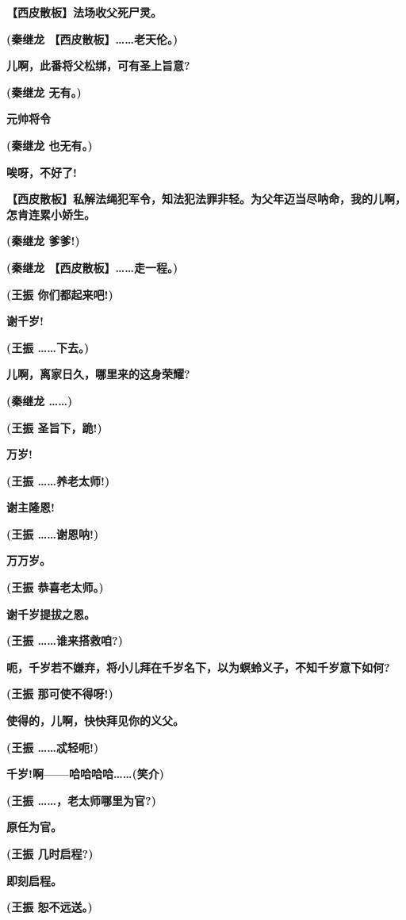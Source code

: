 \textbf{【西皮散板】法场收父死尸灵。}

\textbf{(秦继龙 【西皮散板】\ldots{}\ldots{}老天伦。)}

\textbf{儿啊，此番将父松绑，可有圣上旨意?}

\textbf{(秦继龙 无有。)}

\textbf{元帅将令}

\textbf{(秦继龙 也无有。)}

\textbf{唉呀，不好了!}

\textbf{【西皮散板】私解法绳犯军令，知法犯法罪非轻。为父年迈当尽呐命，我的儿啊，怎肯连累小娇生。}

\textbf{(秦继龙 爹爹!)}

\textbf{(秦继龙 【西皮散板】\ldots{}\ldots{}走一程。)}

\textbf{(王振 你们都起来吧!)}

\textbf{谢千岁!}

\textbf{(王振 \ldots{}\ldots{}下去。)}

\textbf{儿啊，离家日久，哪里来的这身荣耀?}

\textbf{(秦继龙 \ldots{}\ldots{})}

\textbf{(王振 圣旨下，跪!)}

\textbf{万岁!}

\textbf{(王振 \ldots{}\ldots{}养老太师!)}

\textbf{谢主隆恩!}

\textbf{(王振 \ldots{}\ldots{}谢恩呐!)}

\textbf{万万岁。}

\textbf{(王振 恭喜老太师。)}

\textbf{谢千岁提拔之恩。}

\textbf{(王振 \ldots{}\ldots{}谁来搭救咱?)}

\textbf{呃，千岁若不嫌弃，将小儿拜在千岁名下，以为螟蛉义子，不知千岁意下如何?}

\textbf{(王振 那可使不得呀!)}

\textbf{使得的，儿啊，快快拜见你的义父。}

\textbf{(王振 \ldots{}\ldots{}忒轻呃!)}

\textbf{千岁!啊------哈哈哈哈\ldots{}\ldots{}(笑介)}

\textbf{(王振 \ldots{}\ldots{}，老太师哪里为官?)}

\textbf{原任为官。}

\textbf{(王振 几时启程?)}

\textbf{即刻启程。}

\textbf{(王振 恕不远送。)}


